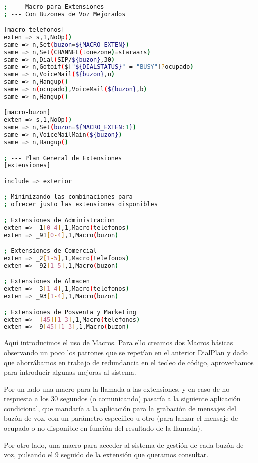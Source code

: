 \begin{lstlisting}[language=bash,title={/etc/asterisk/extensions.conf}]

; --- Macro para Extensiones
; --- Con Buzones de Voz Mejorados

[macro-telefonos]
exten => s,1,NoOp()
same => n,Set(buzon=${MACRO_EXTEN})
same => n,Set(CHANNEL(tonezone)=starwars)
same => n,Dial(SIP/${buzon},30)
same => n,Gotoif($["${DIALSTATUS}" = "BUSY"]?ocupado)
same => n,VoiceMail(${buzon},u)
same => n,Hangup()
same => n(ocupado),VoiceMail(${buzon},b)
same => n,Hangup()

[macro-buzon]
exten => s,1,NoOp()
same => n,Set(buzon=${MACRO_EXTEN:1})
same => n,VoiceMailMain(${buzon})
same => n,Hangup()

; --- Plan General de Extensiones
[extensiones]

include => exterior

; Minimizando las combinaciones para
; ofrecer justo las extensiones disponibles

; Extensiones de Administracion
exten => _1[0-4],1,Macro(telefonos)
exten => _91[0-4],1,Macro(buzon)

; Extensiones de Comercial
exten => _2[1-5],1,Macro(telefonos)
exten => _92[1-5],1,Macro(buzon)

; Extensiones de Almacen
exten => _3[1-4],1,Macro(telefonos)
exten => _93[1-4],1,Macro(buzon)

; Extensiones de Posventa y Marketing
exten => _[45][1-3],1,Macro(telefonos)
exten => _9[45][1-3],1,Macro(buzon)

\end{lstlisting}

Aquí introducimos el uso de Macros. Para ello creamos dos Macros básicas observando un poco los patrones que se repetían en el anterior DialPlan y dado que ahorrábamos en trabajo de redundancia en el tecleo de código, aprovechamos para introducir algunas mejoras al sistema.

Por un lado una macro para la llamada a las extensiones, y en caso de no respuesta a los 30 segundos (o comunicando) pasaría a la siguiente aplicación condicional, que mandaría a la aplicación para la grabación de mensajes del buzón de voz, con un parámetro especifico u otro (para lanzar el mensaje de ocupado o no disponible en función del resultado de la llamada).

Por otro lado, una macro para acceder al sistema de gestión de cada buzón de voz, pulsando el 9 seguido de la extensión que queramos consultar.

